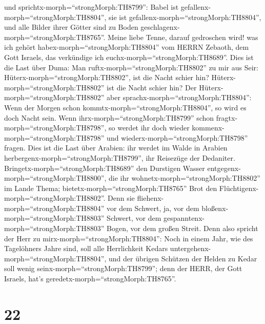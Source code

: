 und sprichtx-morph=``strongMorph:TH8799'': Babel ist
gefallenx-morph=``strongMorph:TH8804'', sie ist
gefallenx-morph=``strongMorph:TH8804'', und alle Bilder ihrer Götter
sind zu Boden geschlagenx-morph=``strongMorph:TH8765''. 
Meine liebe Tenne, darauf gedroschen wird! was ich gehört
habex-morph=``strongMorph:TH8804'' vom HERRN Zebaoth, dem Gott Israels,
das verkündige ich euchx-morph=``strongMorph:TH8689''. 
Dies ist die Last über Duma: Man ruftx-morph=``strongMorph:TH8802'' zu
mir aus Seir: Hüterx-morph=``strongMorph:TH8802'', ist die Nacht schier
hin? Hüterx-morph=``strongMorph:TH8802'' ist die Nacht schier hin?
 Der Hüterx-morph=``strongMorph:TH8802'' aber
sprachx-morph=``strongMorph:TH8804'': Wenn der Morgen schon
kommtx-morph=``strongMorph:TH8804'', so wird es doch Nacht sein. Wenn
ihrx-morph=``strongMorph:TH8799'' schon
fragtx-morph=``strongMorph:TH8798'', so werdet ihr doch wieder
kommenx-morph=``strongMorph:TH8798'' und
wiederx-morph=``strongMorph:TH8798'' fragen.  Dies ist die
Last über Arabien: ihr werdet im Walde in Arabien
herbergenx-morph=``strongMorph:TH8799'', ihr Reisezüge der Dedaniter.
 Bringetx-morph=``strongMorph:TH8689'' den Durstigen Wasser
entgegenx-morph=``strongMorph:TH8800'', die ihr
wohnetx-morph=``strongMorph:TH8802'' im Lande Thema;
bietetx-morph=``strongMorph:TH8765'' Brot den
Flüchtigenx-morph=``strongMorph:TH8802''.  Denn sie
fliehenx-morph=``strongMorph:TH8804'' vor dem Schwert, ja, vor dem
bloßenx-morph=``strongMorph:TH8803'' Schwert, vor dem
gespanntenx-morph=``strongMorph:TH8803'' Bogen, vor dem großen Streit.
 Denn also spricht der Herr zu
mirx-morph=``strongMorph:TH8804'': Noch in einem Jahr, wie des
Tagelöhners Jahre sind, soll alle Herrlichkeit Kedars
untergehenx-morph=``strongMorph:TH8804'',  und der übrigen
Schützen der Helden zu Kedar soll wenig
seinx-morph=``strongMorph:TH8799''; denn der HERR, der Gott Israels,
hat's geredetx-morph=``strongMorph:TH8765''.

\hypertarget{section-21}{%
\section{22}\label{section-21}}

